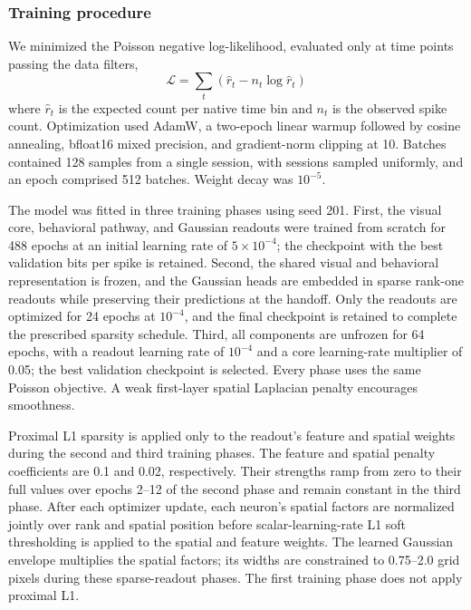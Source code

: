 \documentclass{lite}
\begin{document}
\subsubsection{Training procedure}
We minimized the Poisson negative log-likelihood, evaluated only at time points passing the data filters,
\begin{equation}
    \mathcal{L} = \sum_{t} \left( \hat{r}_t - n_t \log \hat{r}_t \right)
\end{equation}
where $\hat{r}_t$ is the expected count per native time bin and $n_t$ is the observed spike count. Optimization used AdamW, a two-epoch linear warmup followed by cosine annealing, bfloat16 mixed precision, and gradient-norm clipping at 10. Batches contained 128 samples from a single session, with sessions sampled uniformly, and an epoch comprised 512 batches. Weight decay was $10^{-5}$.

The model was fitted in three training phases using seed 201. First, the visual core, behavioral pathway, and Gaussian readouts were trained from scratch for 488 epochs at an initial learning rate of $5\times10^{-4}$; the checkpoint with the best validation bits per spike is retained. Second, the shared visual and behavioral representation is frozen, and the Gaussian heads are embedded in sparse rank-one readouts while preserving their predictions at the handoff. Only the readouts are optimized for 24 epochs at $10^{-4}$, and the final checkpoint is retained to complete the prescribed sparsity schedule. Third, all components are unfrozen for 64 epochs, with a readout learning rate of $10^{-4}$ and a core learning-rate multiplier of 0.05; the best validation checkpoint is selected. Every phase uses the same Poisson objective. A weak first-layer spatial Laplacian penalty encourages smoothness.

Proximal L1 sparsity is applied only to the readout's feature and spatial weights during the second and third training phases. The feature and spatial penalty coefficients are 0.1 and 0.02, respectively. Their strengths ramp from zero to their full values over epochs 2--12 of the second phase and remain constant in the third phase. After each optimizer update, each neuron's spatial factors are normalized jointly over rank and spatial position before scalar-learning-rate L1 soft thresholding is applied to the spatial and feature weights. The learned Gaussian envelope multiplies the spatial factors; its widths are constrained to 0.75--2.0 grid pixels during these sparse-readout phases. The first training phase does not apply proximal L1.
\end{document}
